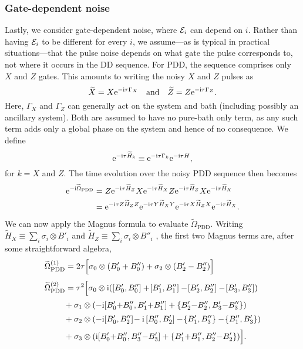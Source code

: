 \documentclass[twocolumn,pra,superscriptaddress]{revtex4-2}
\begin{document}
\subsubsection{Gate-dependent noise}
Lastly, we consider gate-dependent noise, where $\mathcal{E}_i$ can depend on $i$. Rather than having $\mathcal{E}_i$ to be different for every $i$, we assume---as is typical in practical situations---that the pulse noise depends on what gate the pulse corresponds to, not where it occurs in the DD sequence. For PDD, the sequence comprises only $X$ and $Z$ gates. This amounts to writing the noisy $X$ and $Z$ pulses as
\begin{equation}\label{eq:gatedep-noise}
\widetilde{X} = X \mathrm{e}^{-\mathrm{i}\tau \Gamma_X}\quad\textrm{and}\quad \widetilde{Z} = Z \mathrm{e}^{-\mathrm{i} \tau\Gamma_Z}.
\end{equation}
Here, $\Gamma_X$ and $\Gamma_Z$ can generally act on the system and bath (including possibly an ancillary system). Both are assumed to have no pure-bath only term, as any such term adds only a global phase on the system and hence of no consequence.
We define
\begin{equation}\label{eq:Omega-gatedep}
\mathrm{e}^{-\mathrm{i} \tau\widetilde H_k}\equiv \mathrm{e}^{-\mathrm{i} \tau\Gamma_k}\mathrm{e}^{-\mathrm{i}\tau H},
\end{equation}
for $k=X$ and $Z$. The time evolution over the noisy PDD sequence then becomes
\begin{align}
\mathrm{e}^{-\mathrm{i} \widetilde\Omega_\mathrm{PDD} }&= Z \mathrm{e}^{-\mathrm{i} \tau\widetilde H_Z}   X \mathrm{e}^{-\mathrm{i} \tau\widetilde H_X} Z \mathrm{e}^{-\mathrm{i} \tau\widetilde H_Z} X \mathrm{e}^{-\mathrm{i} \tau\widetilde H_X}  \\
& = \mathrm{e}^{-\mathrm{i}\tau Z\widetilde H_ZZ} \mathrm{e}^{-\mathrm{i}\tau Y\widetilde H_XY} \mathrm{e}^{-\mathrm{i}\tau X\widetilde H_ZX} \mathrm{e}^{-\mathrm{i}\tau\widetilde H_X}.\nonumber
\end{align}
We can now apply the Magnus formula   to evaluate $\widetilde\Omega_\mathrm{PDD}$.
Writing $\widetilde H_X \equiv \sum_i \sigma_i \otimes B'_i$ and 
$\widetilde H_Z\equiv \sum_i \sigma_i \otimes B''_i$ , the first two Magnus terms are, after some straightforward algebra,
\begin{align}\label{eq:PDD-gatedep-Mag1}
\widetilde{\Omega}_\mathrm{PDD}^{(1)} 
&= 2\tau{\Bigl[\sigma_0 \otimes (B'_0 + B''_0) + \sigma_2 \otimes (B_2'-B_2'')\Bigr]} \\[1ex]
\widetilde{\Omega}_\mathrm{PDD}^{(2)}& = \notag\tau^2\Bigl[
\sigma_0 \otimes\upi([B'_0,B''_0]+\![B'_1,B''_1]-\![B'_2,B''_2]-\![B'_3,B''_3]) \\[0.5ex]
&\! + \sigma_1 \otimes 
(-\upi[B_0'{+}B_0'',B_1'{+}B_1'']+\{B_2'{-}B_2'', B_3'{-}B_3''\}) \notag \\[0.5ex]
 &\!+ \sigma_2 \otimes 
(-\upi[B_0',B_2'']\!-\upi\,[B_0'',B_2'] -\! \{B_1',B_3''\}
 -\!\{B_1'',B_3'\} ) \notag\\[0.5ex]
 &\!+\sigma_3 \otimes 
(\upi[B_0'{+}B_0'',B_3''{-}B_3'] + \{B_1'{+}B_1'',B_2''{-}B_2'\})\Bigr].\nonumber
\end{align}
\end{document}
